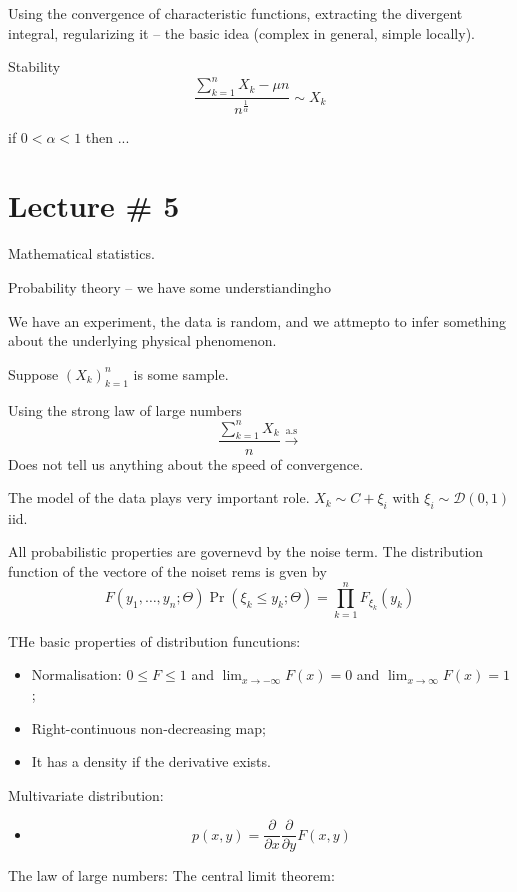 \documentclass[a4paper]{article}
\newcommand{\brac}[1]{{\left ( #1 \right )}}
\begin{document}
Using the convergence of characteristic functions, extracting the divergent integral, regularizing it -- the basic idea (complex in general, simple locally). 

Stability
\[\frac{\sum_{k=1}^n X_k - \mu n}{n^\frac{1}{\alpha}} \sim X_k\]

if $0<\alpha<1$ then ...


\section{Lecture \# 5} %
\label{sec:lecture_5}

Mathematical statistics.

Probability theory -- we have some understiandingho

We have an experiment, the data is random, and we attmepto to infer something about the underlying physical phenomenon.

Suppose $\brac{X_k}_{k=1}^n$ is some sample.

Using the strong law of large numbers \[\frac{\sum_{k=1}^n X_k}{n}\overset{\text{a.s}}{\to}\]
Does not tell us anything about the speed of convergence.

The model of the data plays very important role. $X_k \sim C+\xi_i$ with $\xi_i\sim \mathcal{D}(0,1)$ iid.

All probabilistic properties are governevd by the noise term.
The distribution function of the vectore of the noiset rems is gven by 
\[F\brac{y_1, \ldots, y_n;\Theta} \Pr\brac{\xi_k\leq y_k;\Theta} = \prod_{k=1}^n F_{\xi_k}(y_k)\]

THe basic properties of distribution funcutions:
\begin{itemize}
	\item Normalisation: $0\leq F\leq 1$ and $\lim_{x\to -\infty} F(x)=0$ and $\lim_{x\to \infty} F(x)=1$;
	\item Right-continuous non-decreasing map;
	\item It has a density if the derivative exists.
\end{itemize}

Multivariate distribution:
\begin{itemize}
	\item \[p(x,y) = \frac{\partial}{\partial x}\frac{\partial}{\partial y} F(x,y)\]
\end{itemize}

The law of large numbers:
The central limit theorem:
\end{document}
